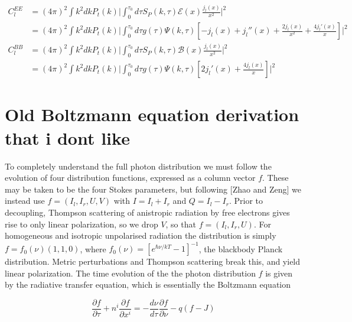 \begin{equation}\begin{split}
C_l^{EE} &= (4\pi)^2 \int k^2 dk P_t(k) \bigg|  \int_0^{\tau_0}d\tau  S_P(k,\tau)\mathcal{E}(x)\frac{j_l(x)}{x^2} \bigg|^2\\
&= (4\pi)^2\int k^2 dk P_t(k) \bigg|  \int_0^{\tau_0}d\tau  g(\tau)\Psi(k, \tau)[-j_l(x) +j_l''(x)+\frac{2j_l(x)}{x^2} + \frac{4j_l'(x)}{x}]\bigg|^2\\
C_l^{BB} &= (4\pi)^2 \int k^2 dk P_t(k) \bigg|  \int_0^{\tau_0}d\tau  S_P(k,\tau)\mathcal{B}(x)\frac{j_l(x)}{x^2} \bigg|^2\\
&= (4\pi)^2\int k^2 dk P_t(k) \bigg|  \int_0^{\tau_0} d\tau g(\tau)\Psi(k, \tau)[2j_l'(x)+\frac{4j_l(x)}{x}]\bigg|^2
\label{primordialBmodes}
\end{split}\end{equation}












\section{Old Boltzmann equation derivation that i dont like}

To completely understand the full photon distribution we must follow the evolution of four distribution functions, expressed as a column vector $f$. These may be taken to be the four Stokes parameters, but following [Zhao and Zeng] we instead use $f=(I_l, I_r, U, V)$ with $I=I_l+I_r$ and $Q=I_l-I_r$. Prior to decoupling, Thompson scattering of anistropic radiation by free electrons gives rise to only linear polarization, so we drop $V$, so that $f=(I_l, I_r, U)$. For homogeneous and isotropic unpolarised radiation the distribution is simply $f=f_0(\nu)(1,1,0)$, where $f_0(\nu)=[e^{\hbar\nu/kT}-1]^{-1}$, the blackbody Planck distribution. Metric perturbations and Thompson scattering break this, and yield linear polarization. The time evolution of the the photon distribution $f$ is given by the radiative transfer equation, which is essentially the Boltzmann equation 

\begin{equation}
\frac{\partial f}{\partial \tau} + \unit{n}^i\frac{\partial f}{\partial x^i} = - \frac{d\nu}{d\tau}\frac{\partial f}{\partial \nu} - q(f-J)
\end{equation}

